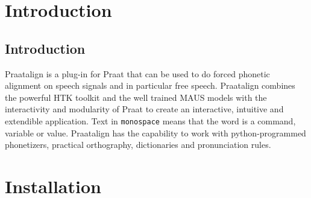 
\cleardoublepage
\maketitle
\setcounter{page}{1}
\tableofcontents
\chapter{Introduction}
\section{Introduction}
Praatalign is a plug-in for Praat that can be used to do forced phonetic
alignment on speech signals and in particular free speech. Praatalign combines
the powerful HTK toolkit and the well trained MAUS models with the
interactivity and modularity of Praat to create an interactive, intuitive and
extendible application. Text in \texttt{monospace} means that the word is a
command, variable or value. Praatalign has the capability to work with
python-programmed phonetizers, practical orthography, dictionaries and
pronunciation rules.

\chapter{Installation}
